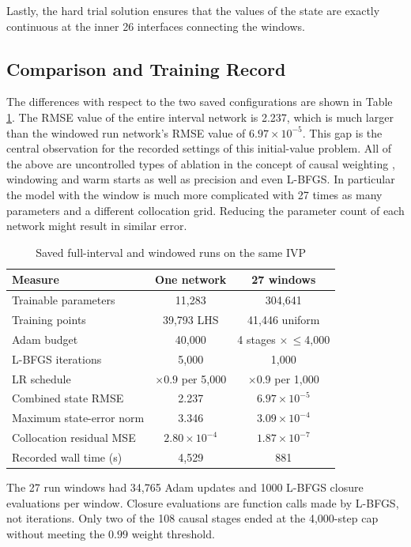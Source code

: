 \documentclass[conference]{IEEEtran}
\begin{document}
Lastly, the hard trial solution ensures that the values of the state are exactly continuous at the inner 26 interfaces connecting the windows.


\subsection{Comparison and Training Record}
\label{sec:comparison}
The differences with respect to the two saved configurations are shown in Table \ref{tab:comparison}. The RMSE value of the entire interval network is 2.237, which is much larger than the windowed run network's RMSE value of $6.97\times10^{-5}$. This gap is the central observation for the recorded settings of this initial-value problem. All of the above are uncontrolled types of ablation in the concept of causal weighting \cite{wang2024causal}, windowing \cite{penwarden2023} and warm starts as well as precision and even L-BFGS. In particular the model with the window is much more complicated with 27 times as many parameters and a different collocation grid. Reducing the parameter count of each network might result in similar error.

\begin{table}[t]
\caption{Saved full-interval and windowed runs on the same IVP}
\label{tab:comparison}
\centering\footnotesize
\begin{tabular}{lcc}
\toprule
Measure & One network & 27 windows\\
\midrule
Trainable parameters & 11,283 & 304,641\\
Training points & 39,793 LHS & 41,446 uniform\\
Adam budget & 40,000 & 4 stages $\times\,\le$4,000\\
L-BFGS iterations & 5,000 & 1,000\\
LR schedule & $\times0.9$ per 5,000 & $\times0.9$ per 1,000\\
Combined state RMSE & 2.237 & $6.97\times10^{-5}$\\
Maximum state-error norm & 3.346 & $3.09\times10^{-4}$\\
Collocation residual MSE & $2.80\times10^{-4}$ & $1.87\times10^{-7}$\\
Recorded wall time (s) & 4,529 & 881\\
\bottomrule
\end{tabular}
\end{table}

The 27 run windows had 34,765 Adam updates and 1000 L-BFGS closure evaluations per window. Closure evaluations are function calls made by L-BFGS, not iterations. Only two of the 108 causal stages ended at the 4,000-step cap without meeting the $0.99$ weight threshold.
\end{document}
